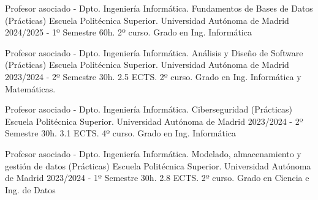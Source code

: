 

\begin{cventries}



  \cventry
	{Profesor asociado - Dpto. Ingeniería Informática.} %
	{Fundamentos de Bases de Datos (Prácticas)} %
	{Escuela Politécnica Superior. Universidad Autónoma de Madrid} %
	{2024/2025 - 1º Semestre} %
	{60h. 2º curso. Grado en Ing. Informática}
	
  \cventry
    {Profesor asociado - Dpto. Ingeniería Informática.} %
    {Análisis y Diseño de Software (Prácticas)} %
    {Escuela Politécnica Superior. Universidad Autónoma de Madrid} %
    {2023/2024 - 2º Semestre} %
    {30h. 2.5 ECTS. 2º curso. Grado en Ing. Informática y Matemáticas.}
    
  \cventry
	{Profesor asociado - Dpto. Ingeniería Informática.} %
	{Ciberseguridad (Prácticas)} %
	{Escuela Politécnica Superior. Universidad Autónoma de Madrid} %
	{2023/2024 - 2º Semestre} %
	{30h. 3.1 ECTS. 4º curso. Grado en Ing. Informática}
	
  \cventry
	{Profesor asociado - Dpto. Ingeniería Informática.} %
	{Modelado, almacenamiento y gestión de datos (Prácticas)} %
	{Escuela Politécnica Superior. Universidad Autónoma de Madrid} %
	{2023/2024 - 1º Semestre} %
	{30h. 2.8 ECTS. 2º curso. Grado en Ciencia e Ing. de Datos}
	

\end{cventries}

